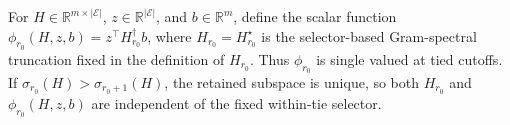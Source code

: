 For \(H\in\mathbb R^{m\times\lvert\mathcal E\rvert}\), \(z\in\mathbb R^{\lvert\mathcal E\rvert}\), and \(b\in\mathbb R^m\), define the scalar function \(\phi_{r_0}(H,z,b)=z^{\top}H_{r_0}^{\dagger}b\), where \(H_{r_0}=H^{\star}_{r_0}\) is the selector-based Gram-spectral truncation fixed in the definition of \(H_{r_0}\). Thus \(\phi_{r_0}\) is single valued at tied cutoffs. If \(\sigma_{r_0}(H)>\sigma_{r_0+1}(H)\), the retained subspace is unique, so both \(H_{r_0}\) and \(\phi_{r_0}(H,z,b)\) are independent of the fixed within-tie selector.